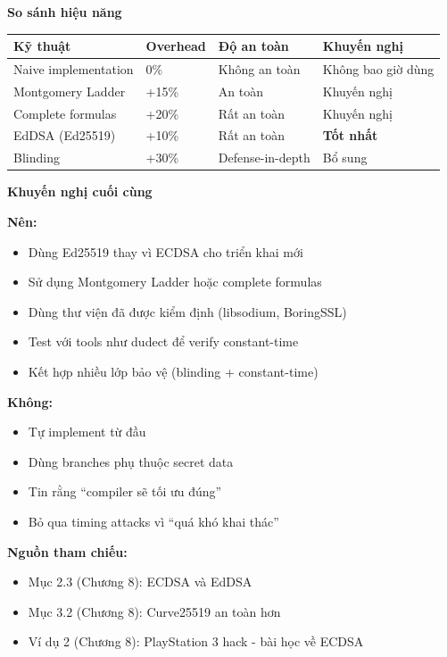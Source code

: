 \textbf{So sánh hiệu năng}

\begin{center}
\begin{tabular}{|l|l|l|l|}
\hline
\textbf{Kỹ thuật} & \textbf{Overhead} & \textbf{Độ an toàn} & \textbf{Khuyến nghị} \\
\hline
Naive implementation & 0\% & Không an toàn & Không bao giờ dùng \\
\hline
Montgomery Ladder & +15\% & An toàn & Khuyến nghị \\
\hline
Complete formulas & +20\% & Rất an toàn & Khuyến nghị \\
\hline
EdDSA (Ed25519) & +10\% & Rất an toàn & \textbf{Tốt nhất} \\
\hline
Blinding & +30\% & Defense-in-depth & Bổ sung \\
\hline
\end{tabular}
\end{center}

\textbf{Khuyến nghị cuối cùng}

\textbf{Nên:}
\begin{itemize}
    \item Dùng Ed25519 thay vì ECDSA cho triển khai mới
    \item Sử dụng Montgomery Ladder hoặc complete formulas
    \item Dùng thư viện đã được kiểm định (libsodium, BoringSSL)
    \item Test với tools như dudect để verify constant-time
    \item Kết hợp nhiều lớp bảo vệ (blinding + constant-time)
\end{itemize}

\textbf{Không:}
\begin{itemize}
    \item Tự implement từ đầu
    \item Dùng branches phụ thuộc secret data
    \item Tin rằng ``compiler sẽ tối ưu đúng''
    \item Bỏ qua timing attacks vì ``quá khó khai thác''
\end{itemize}

\textbf{Nguồn tham chiếu:}
\begin{itemize}
    \item Mục 2.3 (Chương 8): ECDSA và EdDSA
    \item Mục 3.2 (Chương 8): Curve25519 an toàn hơn
    \item Ví dụ 2 (Chương 8): PlayStation 3 hack - bài học về ECDSA
\end{itemize}

